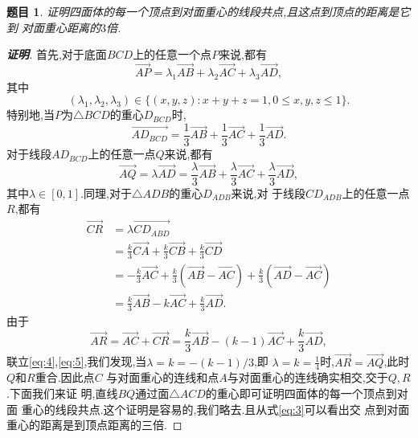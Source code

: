 \documentclass[a4paper]{article}
\newtheorem*{exe}{题目}
\newenvironment{exercise}
{\bigskip\begin{mdframed}\begin{exe}}
    {\end{exe}\end{mdframed}\bigskip}
\newcommand{\ov}{\overrightarrow}
\begin{document}
\begin{exercise}
  证明四面体的每一个顶点到对面重心的线段共点,且这点到顶点的距离是它到
  对面重心距离的$3$倍.
\end{exercise}
\begin{proof}[\textbf{证明}]
首先,对于底面$BCD$上的任意一个点$P$来说,都有
\begin{equation}
  \label{eq:1}
  \ov{AP}=\lambda_1\ov{AB}+\lambda_2\ov{AC}+\lambda_3\ov{AD},
\end{equation}
其中
\begin{equation}
  \label{eq:2}
(\lambda_1,\lambda_2,\lambda_3)\in \{(x,y,z):x+y+z=1,0\leq x,y,z\leq 1\}.
\end{equation}
特别地,当$P$为$\triangle BCD$的重心$D_{BCD}$时,
\begin{equation}
  \label{eq:3}
  \ov{AD_{BCD}}=\frac{1}{3}\ov{AB}+\frac{1}{3}\ov{AC}+\frac{1}{3}\ov{AD}.
\end{equation}
对于线段$AD_{BCD}$上的任意一点$Q$来说,都有
\begin{equation}\label{eq:4}
\ov{AQ}=\lambda\ov{AD}=\frac{\lambda}{3}\ov{AB}+\frac{\lambda}{3}\ov{AC}+\frac{\lambda}{3}\ov{AD},
\end{equation}
其中$\lambda\in [0,1]$.同理,对于$\triangle ADB$的重心$D_{ADB}$来说,对
于线段$CD_{ADB}$上的任意一点$R$,都有
\begin{align}
  \ov{CR}&=\lambda\ov{CD_{ABD}}\\&=\frac{k}{3}\ov{CA}+\frac{k}{3}\ov{CB}+\frac{k}{3}\ov{CD}
\\&=-\frac{k}{3}\ov{AC}+\frac{k}{3}(\ov{AB}-\ov{AC})+\frac{k}{3}(\ov{AD}-\ov{AC})
\\&=\frac{k}{3}\ov{AB}-k\ov{AC}+\frac{k}{3}\ov{AD}.
\end{align}
由于
\begin{equation}\label{eq:5}
\ov{AR}=\ov{AC}+\ov{CR}=\frac{k}{3}\ov{AB}-(k-1)\ov{AC}+\frac{k}{3}\ov{AD},
\end{equation}
联立\eqref{eq:4},\eqref{eq:5},我们发现,当$\lambda=k=-(k-1)/3$,即
$\lambda=k=\frac{1}{4}$时,$\ov{AR}=\ov{AQ}$,此时$Q$和$R$重合.因此点$C$
与对面重心的连线和点$A$与对面重心的连线确实相交,交于$Q,R$.下面我们来证
明,直线$BQ$通过面$\triangle ACD$的重心即可证明四面体的每一个顶点到对面
重心的线段共点.这个证明是容易的,我们略去.且从式\eqref{eq:3}可以看出交
点到对面重心的距离是到顶点距离的三倍.
\end{proof}
\end{document}
